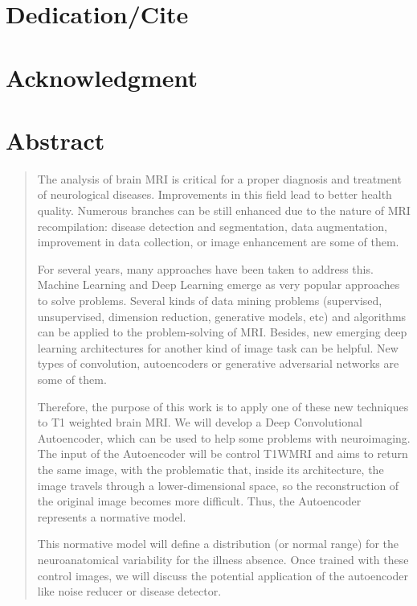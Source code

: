 \chapter*{Dedication/Cite}



\chapter*{Acknowledgment}


\chapter*{\centering Abstract}

\onehalfspacing

\begin{quote}
{The analysis of brain MRI is critical for a proper diagnosis and treatment of neurological diseases. Improvements in this field lead to better health quality. Numerous branches can be still enhanced due to the nature of MRI recompilation: disease detection and segmentation, data augmentation, improvement in data collection, or image enhancement are some of them.

For several years, many approaches have been taken to address this. Machine Learning and Deep Learning emerge as very popular approaches to solve problems. Several kinds of data mining problems (supervised, unsupervised, dimension reduction, generative models, etc) and algorithms can be applied to the problem-solving of MRI. Besides, new emerging deep learning architectures for another kind of image task can be helpful. New types of convolution, autoencoders or generative adversarial networks are some of them.

Therefore, the purpose of this work is to apply one of these new techniques to T1 weighted brain MRI. We will develop a Deep Convolutional Autoencoder, which can be used to help some problems with neuroimaging. The input of the Autoencoder will be control T1WMRI and aims to return the same image, with the problematic that, inside its architecture, the image travels through a lower-dimensional space, so the reconstruction of the original image becomes more difficult. Thus, the Autoencoder represents a normative model.

This normative model will define a distribution (or normal range) for the neuroanatomical variability for the illness absence. Once trained with these control images, we will discuss the potential application of the autoencoder like noise reducer or disease detector.}
\end{quote}


